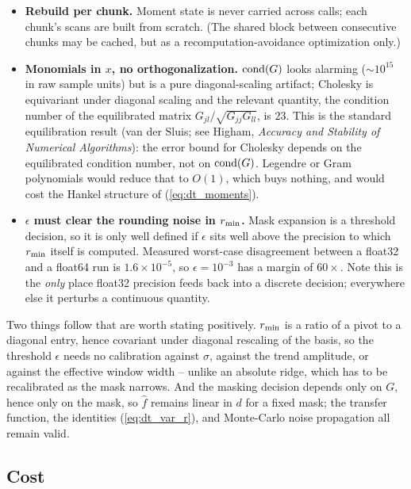 \documentclass{article}
\numberwithin{equation}{section}   %
\begin{document}
\begin{itemize}
Seen less numerically, the offset {\em is} the zeroth-order piece of the trend: this just splits the trend into
a crude constant handled once per chunk plus the local polynomial handled per sample.
\item {\bf Rebuild per chunk.}  Moment state is never carried across calls; each chunk's scans are built from
scratch.  (The shared block between consecutive chunks may be cached, but as a recomputation-avoidance
optimization only.)
\item {\bf Monomials in $x$, no orthogonalization.}  ${\rm cond}(G)$ looks alarming ($\sim\!10^{15}$ in raw
sample units) but is a pure diagonal-scaling artifact; Cholesky is equivariant under diagonal scaling and the
relevant quantity, the condition number of the equilibrated matrix $G_{jl}/\sqrt{G_{jj}G_{ll}}$, is $23$.
This is the standard equilibration result (van der Sluis; see Higham, {\em Accuracy and Stability of Numerical
Algorithms}): the error bound for Cholesky depends on the equilibrated condition number, not on
${\rm cond}(G)$.
Legendre or Gram polynomials would reduce that to $O(1)$, which buys nothing, and would cost the Hankel
structure of (\ref{eq:dt_moments}).
\item {\bf $\epsilon$ must clear the rounding noise in $r_{\rm min}$.}  Mask expansion is a threshold decision,
so it is only well defined if $\epsilon$ sits well above the precision to which $r_{\rm min}$ itself is
computed.  Measured worst-case disagreement between a float32 and a float64 run is $1.6\times10^{-5}$, so
$\epsilon = 10^{-3}$ has a margin of $60\times$.  Note this is the {\em only} place float32 precision feeds back
into a discrete decision; everywhere else it perturbs a continuous quantity.
\end{itemize}

Two things follow that are worth stating positively.  $r_{\rm min}$ is a ratio of a pivot to a diagonal entry,
hence covariant under diagonal rescaling of the basis, so the threshold $\epsilon$ needs no calibration against
$\sigma$, against the trend amplitude, or against the effective window width -- unlike an absolute ridge, which
has to be recalibrated as the mask narrows.  And the masking decision depends only on $G$, hence only on the
mask, so $\hat f$ remains linear in $d$ for a fixed mask; the transfer function, the identities
(\ref{eq:dt_var_r}), and Monte-Carlo noise propagation all remain valid.

\subsection{Cost}
\label{sec:dt_cost}
\end{document}
